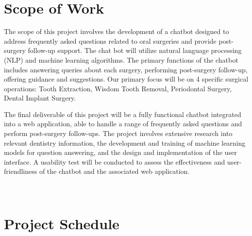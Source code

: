 \documentclass[12pt,oneside,openright,a4paper]{cpe-english-project}
\begin{document}
\section{Scope of Work}
  \qquad The scope of this project involves the development of a chatbot designed to address frequently asked questions related to oral surgeries and provide post-surgery follow-up support. The chat bot will utilize natural language processing (NLP) and machine learning algorithms. The primary functions of the chatbot includes answering queries about each surgery, performing post-surgery follow-up, offering guidance and suggestions. Our primary focus will be on 4 specific surgical operations: Tooth Extraction, Wisdom Tooth Removal, Periodontal Surgery, Dental Implant Surgery. \par
  \qquad The final deliverable of this project will be a fully functional chatbot integrated into a web application, able to handle a range of frequently asked questions and perform post-surgery follow-ups. The project involves extensive research into relevant dentistry information, the development and training of machine learning models for question answering, and the design and implementation of the user interface. A usability test will be conducted to assess the effectiveness and user-friendliness of the chatbot and the associated web application. \par

\section{\null\\ Project Schedule}
\end{document}
